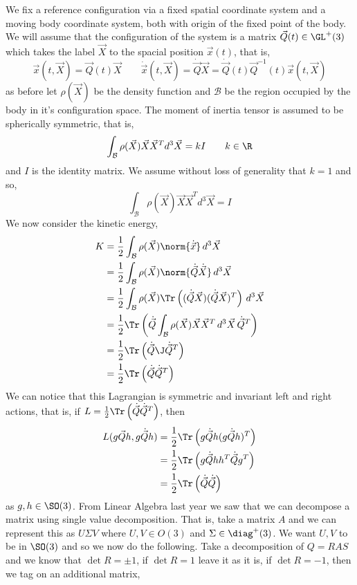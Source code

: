We fix a reference configuration via a fixed spatial coordinate system and a moving body coordinate system, both with origin of the fixed point of the body. We will assume that the configuration of the system is a matrix $\vec Q(t) \in \GL^+(3)$ which takes the label $\vec X$ to the spacial position $\vec x(t)$, that is,
$$ \vec x(t, \vec X) = \vec Q(t)\vec X \qquad \dot{\vec x}(t, \vec X) = \dot{\vec Q}\vec X = \dot{\vec Q}(t)\vec Q^{-1}(t)\vec x(t, \vec X) $$
as before let $\rho(\vec X)$ be the density function and $\mathcal{B}$ be the region occupied by the body in it's configuration space. The moment of inertia tensor is assumed to be spherically symmetric, that is,
$$ \int_{\mathcal{B}} \rho(\vec X)\vec X\vec X^T d^3\vec X = kI \qquad k \in \R $$
and $I$ is the identity matrix. We assume without loss of generality that $k = 1$ and so,
$$ \int_{\mathcal{B}} \rho(\vec X)\vec X\vec X^T d^3\vec X = I $$
We now consider the kinetic energy,
\begin{align*}
  K &= \frac{1}{2}\int_{\mathcal{B}} \rho(\vec X) \norm{\dot{\vec x}}\, d^3 \vec X \\
  &= \frac{1}{2}\int_{\mathcal{B}} \rho(\vec X) \norm{\dot{\vec Q}\dot{\vec X}}\, d^3 \vec X \\
  &= \frac{1}{2}\int_{\mathcal{B}} \rho(\vec X) \Tr\left( (\dot{\vec Q}\vec X)(\dot{\vec Q}\vec X)^T \right)\, d^3 \vec X \\
  &= \frac{1}{2}\Tr\left(\dot{\vec Q}\int_{\mathcal{B}} \rho(\vec X) \vec X\vec X^T \, d^3 \vec X\, \dot{\vec Q}^T \right)\\
  &= \frac{1}{2}\Tr\left( \dot{\vec Q}\J\dot{\vec Q}^T \right) \\
  &= \frac{1}{2}\Tr\left( \dot{\vec Q}\dot{\vec Q}^T \right)
\end{align*}
We can notice that this Lagrangian is symmetric and invariant left and right actions, that is, if $L = \frac{1}{2}\Tr\left(\dot{\vec Q}\dot{\vec Q}^T\right)$, then \begin{align*}
  L(g\vec{Q}h, g\dot{\vec Q}h) &= \frac{1}{2}\Tr\left( g\dot{\vec Q}h(g\dot{\vec Q}h)^T \right) \\
  &= \frac{1}{2}\Tr\left( g\dot{\vec Q}hh^T\dot{\vec Q}g^T \right) \\
  &= \frac{1}{2}\Tr\left( \dot{\vec Q}\dot{\vec Q} \right)
\end{align*}
as $g, h \in \SO(3)$.
From Linear Algebra last year we saw that we can decompose a matrix using single value decomposition. That is, take a matrix $A$ and we can represent this as $U\Sigma V$ where $U, V \in O(3)$ and $\Sigma \in \diag^+(3)$. We want $U,V$ to be in $\SO(3)$ and so we now do the following. Take a decomposition of $Q = RAS$ and we know that $\det R = \pm 1$, if $\det R = 1$ leave it as it is, if $\det R = -1$, then we tag on an additional matrix,

